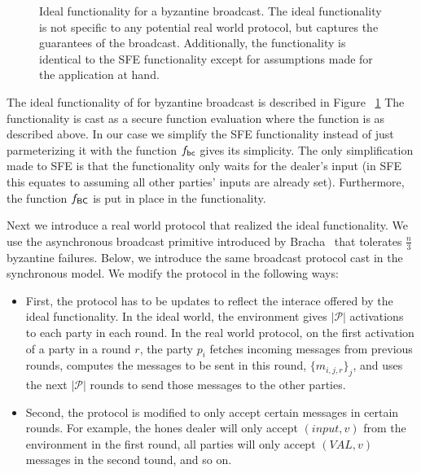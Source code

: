 \begin{figure}[!h]
	
	\label{fig:functionality:broadcast}
	\caption{Ideal functionality for a byzantine broadcast. The ideal functionality is not specific to any potential real world protocol, but captures the guarantees of the broadcast. Additionally, the functionality is identical to the SFE functionality except for assumptions made for the application at hand.}
\end{figure}

The ideal functionality of for byzantine broadcast is described in Figure ~\ref{fig:functionality:broadcast}
The functionality is cast as a secure function evaluation where the function is as described above.
In our case we simplify the SFE functionality instead of just parmeterizing it with the function $f_{{\mathsf {bc}}}$ gives its simplicity.
The only simplification made to SFE is that the functionality only waits for the dealer's input (in SFE this equates to assuming all other parties' inputs are already set).
Furthermore, the function $f_{{\mathsf {BC}}}$ is put in place in the functionality.

%	

Next we introduce a real world protocol that realized the ideal functionality.
We use the asynchronous broadcast primitive introduced by Bracha~\cite{bracha-broadcast} that tolerates $\frac{n}{3}$ byzantine failures.
Below, we introduce the same broadcast protocol cast in the synchronous model.
We modify the protocol in the following ways:

\begin{itemize}
	\item First, the protocol has to be updates to reflect the interace offered by the ideal functionality. In the ideal world, the environment gives $|\mathcal{P}|$ activations to each party in each round. In the real world protocol, on the first activation of a party in a round $r$, the party $p_i$ fetches incoming messages from previous rounds, computes the messages to be sent in this round, $\{m_{i,j,r}\}_{j}$, and uses the next $|\mathcal{P}|$ rounds to send those messages to the other parties.
	\item Second, the protocol is modified to only accept certain messages in certain rounds. For example, the hones dealer will only accept $(input,v)$ from the environment in the first round, all parties will only accept $(VAL,v)$ messages in the second tound, and so on.
\end{itemize}


